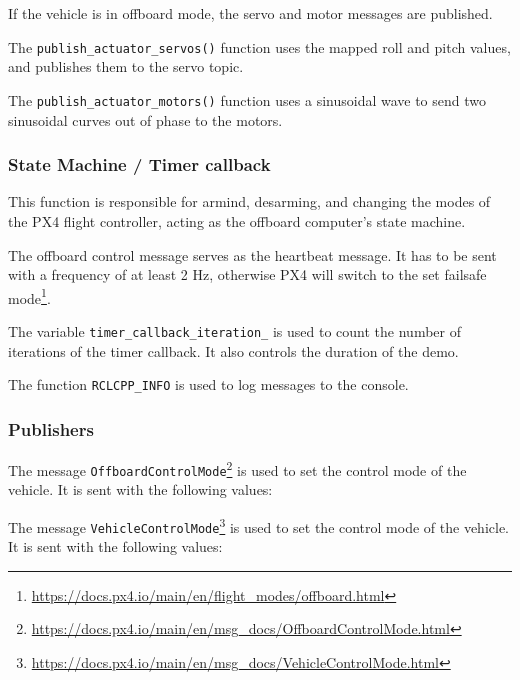 \documentclass[a4paper]{article}
\begin{document}
If the vehicle is in offboard mode, the servo and motor messages are published. 

The \verb|publish_actuator_servos()| function uses the mapped roll and pitch values, and publishes them to the servo topic. 

The \verb|publish_actuator_motors()| function uses a sinusoidal wave to send two sinusoidal curves out of phase to the motors. 

\subsubsection{State Machine / Timer callback}

This function is responsible for armind, desarming, and changing the modes of the PX4 flight controller, acting as the offboard computer's state machine. 

The offboard control message serves as the heartbeat message. It has to be sent with a frequency of at least 2 Hz, otherwise PX4 will switch to the set failsafe mode\footnote{\url{https://docs.px4.io/main/en/flight_modes/offboard.html}}. 



The variable \verb|timer_callback_iteration_| is used to count the number of iterations of the timer callback. 
It also controls the duration of the demo. 

The function \verb|RCLCPP_INFO| is used to log messages to the console.

\subsubsection{Publishers}

The message \verb|OffboardControlMode|\footnote{\url{https://docs.px4.io/main/en/msg_docs/OffboardControlMode.html}} is used to set the control mode of the vehicle. 
It is sent with the following values: 



The message \verb|VehicleControlMode|\footnote{\url{https://docs.px4.io/main/en/msg_docs/VehicleControlMode.html}} is used to set the control mode of the vehicle.
It is sent with the following values:
\end{document}
